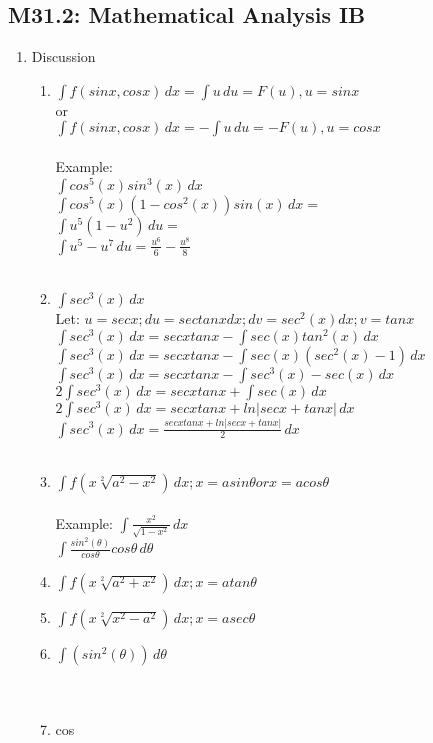 \documentclass{article}
\begin{document}
\subsection*{M31.2: Mathematical Analysis IB}
\begin{enumerate}
    \item Discussion
    \begin{enumerate}
        \item $\int f(sinx,cosx) \,dx = \int u \,du = F(u), u = sinx$\\or\\
        $\int f(sinx,cosx) \,dx = -\int u \,du = -F(u), u = cosx$ 
        \\\\Example:\\
        $\int {cos^5(x)sin^3(x)} \,dx $\\
        $\int {cos^5(x)(1-cos^2(x))sin(x)} \,dx = $\\
        $\int {u^5(1-u^2)} \,du = $\\
        $\int {u^5-u^7} \,du = {\frac{u^6}{6}-\frac{u^8}{8}}$\\\\
        \item $\int {sec^3(x)} \,dx $\\
        Let: $u=secx;du=sectanxdx;dv=sec^2(x)dx;v=tanx$\\
        $\int {sec^3(x)} \,dx = secxtanx - \int {sec(x)tan^2(x)} \,dx $\\
        $\int {sec^3(x)} \,dx = secxtanx - \int {sec(x)(sec^2(x)-1)} \,dx $\\
        $\int {sec^3(x)} \,dx = secxtanx - \int {sec^3(x)-sec(x)} \,dx $\\
        $2\int {sec^3(x)} \,dx = secxtanx + \int {sec(x)} \,dx $\\
        $2\int {sec^3(x)} \,dx = secxtanx + ln|secx+tanx| \,dx $\\
        $\int {sec^3(x)} \,dx = \frac{secxtanx + ln|secx+tanx|}{2} \,dx $\\\\
        \item $\int f(x\sqrt[2]{a^2-x^2}) \,dx; x=asin\theta or x=acos\theta$\\\\
        Example: $\int {\frac{x^2}{\sqrt{1-x^2}}} \,dx$\\
        $\int {\frac{sin^2(\theta)}{cos\theta}cos\theta} \,d\theta$\\

        \item $\int f(x\sqrt[2]{a^2+x^2}) \,dx; x=atan\theta$\\
        \item $\int f(x\sqrt[2]{x^2-a^2}) \,dx; x=asec\theta$\\
        \item $\int(sin^2(\theta)) \,d\theta$\\\\\\
        \item cos
        

\end{enumerate}
\end{enumerate}
\end{document}
